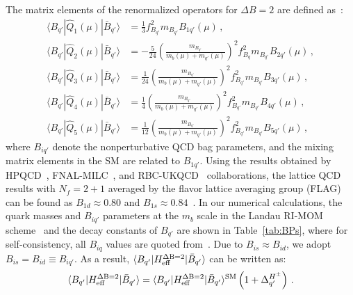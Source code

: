 \documentclass[prd,preprint,superscriptaddress,amsmath,amssymb]{revtex4}
\begin{document}
The matrix elements of the renormalized operators for $\Delta B=2$ are defined as~\cite{Becirevic:2001jj}:
 \begin{subequations}
 \begin{align}
 \langle B_{q'} | \hat Q_1(\mu)  |  \bar B_{q'} \rangle   &= \frac{1}{3} f^2_{B_{q'}} m_{B_{q'}} B_{1q'}(\mu) \,,  \\
  \langle B_{q'} | \hat Q_2(\mu)  | \bar B_{q'}\rangle  &= -\frac{5}{24} \left(\frac{m_{B_{q'}}}{m_b(\mu) + m_{q'} (\mu)} \right)^2  f^2_{B_q} m_{B_{q'}} B_{2{q'}}(\mu) \,,  \\
   \langle B_{q'} | \hat Q_3(\mu)  | \bar B_{q'}\rangle  &= \frac{1}{24} \left(\frac{m_{B_{q'}}}{m_b(\mu) + m_{q'} (\mu)} \right)^2  f^2_{B_{q'}} m_{B_{q'}} B_{3q'}(\mu) \,,  \\
   \langle B_{q'} | \hat Q_4(\mu)  | \bar B_{q'}\rangle  &= \frac{1}{4} \left(\frac{m_{B_{q'}}}{m_b(\mu) + m_{q'} (\mu)} \right)^2  f^2_{B_{q'}} m_{B_{q'}} B_{4q'}(\mu) \,,   \\
   \langle B_{q'} | \hat Q_5(\mu)  | \bar B_{q'}\rangle  &= \frac{1}{12} \left(\frac{m_{B_{q'}}}{m_b(\mu) + m_{q'} (\mu)} \right)^2  f^2_{B_{q'}} m_{B_{q'}} B_{5q'}(\mu) \,,
 \end{align}
 \label{eq:BBmatrix}
 \end{subequations}
 where $B_{iq'}$ denote the nonperturbative QCD bag parameters, and the mixing matrix elements in the SM are related to  $B_{1q'}$. Using the results obtained by HPQCD~\cite{Gamiz:2009ku}, FNAL-MILC~\cite{Bazavov:2012zs}, and RBC-UKQCD~\cite{Aoki:2014nga} collaborations, the  lattice QCD results  with $N_f=2+1$ averaged by the flavor lattice averaging group (FLAG) can be found as $B_{1d} \approx 0.80$ and $B_{1s}\approx 0.84$~\cite{Aoki:2016frl}. In our numerical calculations,  the quark masses and $B_{iq'}$ parameters at the $m_b$ scale  in the Landau RI-MOM scheme~\cite{Becirevic:2001jj,Becirevic:2001xt,Becirevic:2001yv,Carrasco:2013zta} and the decay constants of $B_{q'}$ are shown in Table~\ref{tab:BPs}, where for self-consistency, all $B_{iq}$ values are quoted from~\cite{Carrasco:2013zta}. Due to $B_{is}\approx B_{id}$, we adopt $B_{is}= B_{id}\equiv B_{iq'}$.  As a result,  $\langle B_{q'}| H^{\rm \Delta B=2}_{\rm eff} | \bar B_{q'} \rangle $ can be written as:
 \begin{equation}
\langle B_{q'}| H^{\rm \Delta B=2}_{\rm eff} | \bar B_{q'} \rangle =  \langle B_{q'}| H^{\rm \Delta B=2}_{\rm eff} | \bar B_{q'} \rangle^{\rm SM} \left( 1 + \Delta^{H^\pm}_{q'} \right)\,.
\end{equation}
\end{document}
